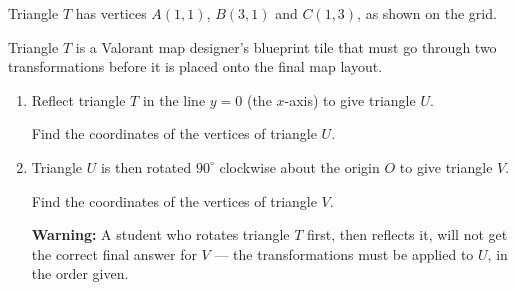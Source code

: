 \begin{question}
\noindent Triangle $T$ has vertices $A(1,1)$, $B(3,1)$ and $C(1,3)$, as shown on the grid.

\begin{center}
\end{center}

\noindent Triangle $T$ is a Valorant map designer's blueprint tile that must go through two transformations before it is placed onto the final map layout.

\begin{enumerate}
    \item[(a)] Reflect triangle $T$ in the line $y = 0$ (the $x$-axis) to give triangle $U$.

    Find the coordinates of the vertices of triangle $U$.
    \vspace{4cm}

    \item[(b)] Triangle $U$ is then rotated $90^\circ$ clockwise about the origin $O$ to give triangle $V$.

    Find the coordinates of the vertices of triangle $V$.

    \noindent \textbf{Warning:} A student who rotates triangle $T$ first, then reflects it, will not get the correct final answer for $V$ --- the transformations must be applied to $U$, in the order given.
    \vspace{4cm}
\end{enumerate}
\end{question}
